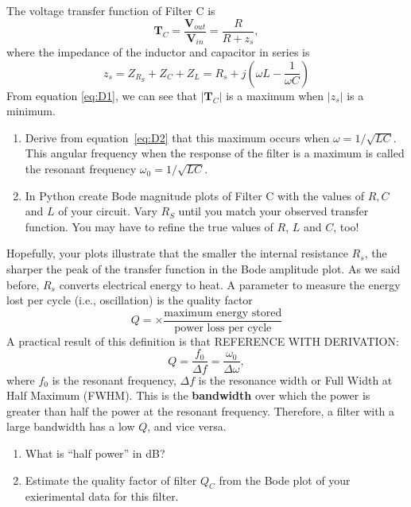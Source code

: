\documentclass{article}
\begin{document}
The voltage transfer function of Filter C is
\begin{equation}
  \mathbf{T}_C=\frac{\mathbf{V}_{out}}{\mathbf{V}_{in}}=\frac{R}{R+z_s},
  \label{eq:D1}
\end{equation}
where the impedance of the inductor and capacitor in series is
\begin{equation}
  z_s=Z_{R_S}+ Z_C + Z_L = R_s+j\left(\omega L-\frac{1}{\omega  C}\right)
  \label{eq:D2}
\end{equation}
From equation \ref{eq:D1}, we can see that $|\mathbf{T}_C|$ is a maximum
when $|z_s|$ is a minimum.
\begin{enumerate}[resume]
\item Derive from equation~\ref{eq:D2} that this maximum occurs when
  $\omega=1/\sqrt{LC}$.  This angular frequency when the response of
  the filter is a maximum is called the resonant frequency
  $\omega_0 = 1/\sqrt{LC}$. %
\item In Python create Bode magnitude plots of Filter C with the
  values of $R,C$ and $L$ of your circuit. Vary $R_S$ until you match your
  observed transfer function. You may have to refine the true values
  of $R$, $L$ and $C$, too!
\end{enumerate}
Hopefully, your plots illustrate that the smaller the internal resistance
$R_s$, the sharper the peak of the transfer function in the Bode
amplitude plot. As we said before, $R_s$ converts electrical energy to
heat. A parameter to measure the energy lost per cycle (i.e.,
oscillation) is the quality factor
\begin{equation}
  Q = \times {\frac {\text{maximum energy stored}}{\text{power loss per cycle}}}
\end{equation}
A practical result of this definition is that {REFERENCE WITH
  DERIVATION}:
\begin{equation}
  Q =  \frac {f_0}{\Delta f}=\frac {\omega _0}{\Delta \omega },
  \label{eq:Q}
\end{equation}
where $f_0$ is the resonant frequency, $\Delta f$ is the resonance
width or Full Width at Half Maximum (FWHM). This is the {\bf
  bandwidth} over which the power is greater than half the power at
the resonant frequency. Therefore, a filter with a large bandwidth has
a low $Q$, and vice versa.

\begin{enumerate}[resume]
\item What is ``half power'' in dB?
\item Estimate the quality factor of filter $Q_C$ from the Bode plot
  of your exierimental data for this filter.
\end{enumerate}
\end{document}
